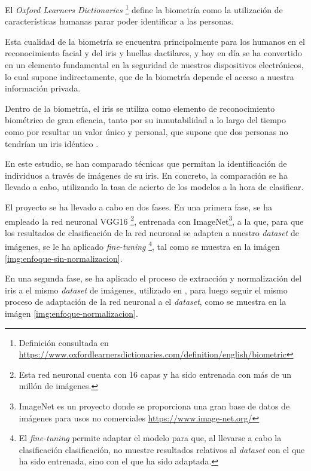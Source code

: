  \label{capitulo1}

El \textit{Oxford Learners Dictionaries} \footnote{Definición consultada en \url{https://www.oxfordlearnersdictionaries.com/definition/english/biometric}} define la biometría como la utilización de características humanas parar poder identificar a las personas.

Esta cualidad de la biometría se encuentra principalmente para los humanos en el reconocimiento facial y del iris y huellas dactilares, y hoy en día
se ha convertido en un elemento fundamental en la seguridad de nuestros dispositivos electrónicos, lo cual supone indirectamente,
que de la biometría depende el acceso a nuestra información privada.

Dentro de la biometría, el iris se utiliza como elemento de reconocimiento biométrico de gran eficacia, tanto por su inmutabilidad a lo largo del tiempo como por resultar un valor único y 
personal, que supone que dos personas no tendrían un iris idéntico \cite{malgheet_iris_2021}. 

En este estudio, se han comparado técnicas que permitan la identificación de individuos a través de imágenes de su iris. 
En concreto, la comparación se ha llevado a cabo, utilizando la tasa de acierto de los modelos a la hora de clasificar. 

El proyecto se ha llevado a cabo en dos fases. En una primera fase, se ha empleado la red neuronal VGG16 \footnote{Esta red neuronal cuenta con 16 capas y ha sido entrenada con más de un millón de imágenes.}, entrenada con ImageNet\footnote{ImageNet es un proyecto donde se proporciona 
una gran base de datos de imágenes para usos no comerciales \url{https://www.image-net.org/}}, a la que, para que los resultados de clasificación de la red neuronal se adapten a nuestro \textit{dataset} de imágenes, se le ha aplicado \textit{fine-tuning} \footnote{El \textit{fine-tuning} 
permite adaptar el modelo para que, al llevarse a cabo la clasificación clasificación, no muestre resultados relativos al \textit{dataset} con el que ha sido entrenada, sino con el que ha sido adaptada.}, tal como se muestra en la imágen \ref{img:enfoque-sin-normalizacion}.



En una segunda fase, se ha aplicado el proceso de extracción y normalización del iris a el mismo \textit{dataset} de imágenes, utilizado en \cite{tfg_iris_2020}, para luego seguir el mismo proceso de adaptación de la red neuronal
a el \textit{dataset}, como se muestra en la imágen \ref{img:enfoque-normalizacion}.

